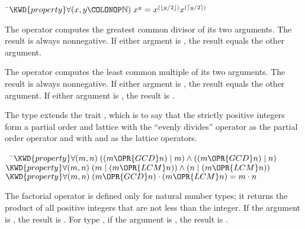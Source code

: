 \begin{Fortress}
{\tt~}\pushtabs\=\+\( \KWD{property} \forall(x, y\COLONOP\mathbb{N})\; x^{y} = x^{(\lfloor y/2 \rfloor)} x^{(\lceil y/2 \rceil)}\)\-\\\poptabs
\end{Fortress}


The operator  computes the greatest common divisor of its two arguments.
The result is always nonnegative.  If either argment is , the result
equals the other argument.

The operator  computes the least common multiple of its two arguments.
The result is always nonnegative.  If either argment is , the result
equals the other argument.  If either argument is , the result is .

The type  extends the trait
,
which is to say that the strictly positive integers form a partial order and lattice with
the ``evenly divides'' operator \EXP{\mid} as the partial order operator and
with  and  as the lattice operators.


\begin{Fortress}
{\tt~~}\pushtabs\=\+\(  \KWD{property} \forall (m, n)\; ((m \OPR{GCD} n) \mid m) \wedge ((m \OPR{GCD} n) \mid n)\)\\
\(  \KWD{property} \forall (m, n)\; (m \mid (m \OPR{LCM} n)) \wedge (n \mid (m \OPR{LCM} n))\)\\
\(  \KWD{property} \forall (m, n)\; (m \OPR{GCD} n) \cdot (m \OPR{LCM} n) = m \cdot n\)\-\\\poptabs
\end{Fortress}





The factorial operator is defined only for natural number types;
it returns the product of all positive integers that are not less than the integer.
If the argument is , the result is .  For type ,
if the argument is \EXP{+\infty}, the result is \EXP{+\infty}.

